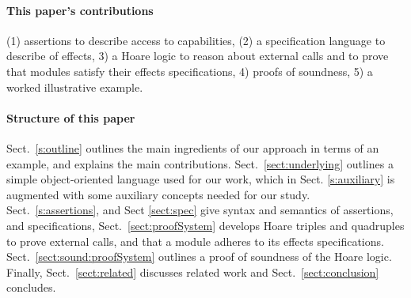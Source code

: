 

\paragraph{This paper's contributions} %
{(1) assertions to describe   access to capabilities}, 
(2) a specification language to describe \taming of effects,
3) a Hoare logic to reason about external calls and to prove that modules satisfy their \tamed effects specifications,
4)  proofs of soundness,
5) a worked illustrative example.
 

 \paragraph{Structure of this paper}
Sect.\ \ref{s:outline}   outlines the main ingredients of our approach in terms of an example, and explains the main contributions.
Sect.\ \ref{sect:underlying} outlines a simple object-oriented language used for our work, which in Sect. \ref{s:auxiliary} is augmented with some auxiliary concepts needed for our study.
Sect.\ \ref{s:assertions}, and Sect \ref{sect:spec}  give syntax and semantics of assertions, and  specifications,
Sect.\ \ref{sect:proofSystem} develops Hoare triples and quadruples to prove external calls, and that a module adheres to its \tamed effects specifications.
Sect.\ \ref{sect:sound:proofSystem} outlines a proof of soundness of
the Hoare logic. Finally, Sect.\ \ref{sect:related} discusses related
work and Sect.\ \ref{sect:conclusion} concludes. 
 
